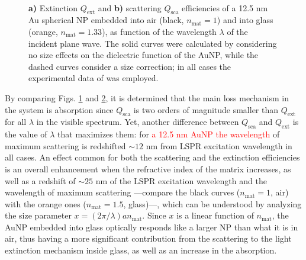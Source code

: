 \begin{figure}[h!]
	\def\svgwidth{1\textwidth} \small
  \vspace*{3.0em}
  \hspace*{-.25\textwidth}
    \begin{subfigure}{.51\textwidth}\caption{ }\label{fig:Mieefficiencies:a}\end{subfigure}
    \begin{subfigure}{.49\textwidth}\caption{ }\label{fig:Mieefficiencies:b}\end{subfigure}
  \vspace*{-6.em}\\
  \vspace*{-2em}
  \caption[Extinction and Scattering Efficiency of a 12.5 nm Au Spherical NP embedded into Air and Glass]{ \textbf{a)} Extinction $Q_\text{ext}$ and \textbf{b)} scattering $Q_\text{sca}$ efficiencies of a 12.5 nm Au spherical NP embedded into air (black, $n_\text{mat} = 1$)  and into glass (orange, $n_\text{mat} = 1.33$), as function of the wavelength $\lambda$ of the incident plane wave.  The solid curves were calculated by considering no size effects on the dielectric function of the AuNP, while the dashed curves consider a size correction; in all cases the experimental data of \citeauthor{johnson_optical_1972} \cite{johnson_optical_1972} was employed.}
\label{fig:Mieefficiencies}
\end{figure}

By comparing Figs. \ref{fig:Mieefficiencies:a} and \ref{fig:Mieefficiencies:b}, it is determined that the main loss mechanism in the system is absorption since $Q_\text{sca}$ is two orders of magnitude smaller than $Q_\text{ext}$ for all $\lambda$ in the visible spectrum. Yet, another difference between  $Q_\text{sca}$ and  $Q_\text{ext}$ is the value of $\lambda$ that maximizes them: for \textcolor{red}{a 12.5 nm AuNP the wavelength} of maximum scattering is redshifted $\sim 12$ nm from  LSPR excitation wavelength in all cases. An effect common for both the scattering and the extinction efficiencies is an overall enhancement  when the refractive index of the matrix increases, as well as a redshift of $\sim 25$ nm of the LSPR excitation wavelength and the wavelength of maximum scattering ---compare the black curves ($n_\text{mat} = 1$, air) with the orange ones ($n_\text{mat} = 1.5$, glass)---, which can be understood by analyzing the size parameter $ x = (2 \pi / \lambda ) a n_\text{mat} $. Since $x$ is a linear function of $n_\text{mat}$, the AuNP embedded into glass optically responds like a larger NP than what it is in air, thus having a more significant contribution from the scattering to the light extinction mechanism inside glass, as well as an increase in the absorption.

